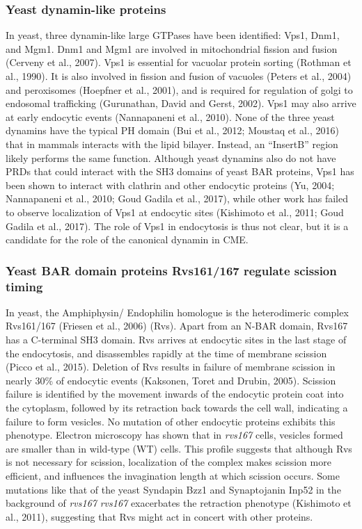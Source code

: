		\subsubsection{Yeast dynamin-like proteins}
In yeast, three dynamin-like large GTPases have been identified: Vps1, Dnm1, and Mgm1. Dnm1 and Mgm1 are involved in mitochondrial fission and fusion (Cerveny et al., 2007). Vps1 is essential for vacuolar protein sorting (Rothman et al., 1990). It is also involved in fission and fusion of vacuoles (Peters et al., 2004) and peroxisomes (Hoepfner et al., 2001), and is required for regulation of golgi to endosomal trafficking (Gurunathan, David and Gerst, 2002). Vps1 may also arrive at early endocytic events (Nannapaneni et al., 2010). None of the three yeast dynamins have the typical PH domain (Bui et al., 2012; Moustaq et al., 2016) that in mammals interacts with the lipid bilayer. Instead, an “InsertB” region likely performs the same function. Although yeast dynamins also do not have PRDs that could interact with the SH3 domains of yeast BAR proteins, Vps1 has been shown to interact with clathrin and other endocytic proteins (Yu, 2004; Nannapaneni et al., 2010; Goud Gadila et al., 2017), while other work has failed to observe localization of Vps1 at endocytic sites (Kishimoto et al., 2011; Goud Gadila et al., 2017). The role of Vps1 in endocytosis is thus not clear, but it is a candidate for the role of the canonical dynamin in CME.



		\subsubsection{Yeast BAR domain proteins Rvs161/167 regulate scission timing}
In yeast, the Amphiphysin/ Endophilin homologue is the heterodimeric complex Rvs161/167 (Friesen et al., 2006) (Rvs). Apart from an N-BAR domain, Rvs167 has a C-terminal SH3 domain. Rvs arrives at endocytic sites in the last stage of the endocytosis, and disassembles rapidly at the time of membrane scission (Picco et al., 2015). Deletion of Rvs results in failure of membrane scission in nearly 30\% of endocytic events (Kaksonen, Toret and Drubin, 2005). Scission failure is identified by the movement inwards of the endocytic protein coat into the cytoplasm, followed by its retraction back towards the cell wall, indicating a failure to form vesicles. No mutation of other endocytic proteins exhibits this phenotype. Electron microscopy has shown that in \textit{rvs167\textDelta} cells, vesicles formed are smaller than in wild-type (WT) cells. This profile suggests that although Rvs is not necessary for scission, localization of the complex makes scission more efficient, and influences the invagination length at which scission occurs. Some mutations like that of the yeast Syndapin Bzz1 and Synaptojanin Inp52 in the background of \textit{rvs167\textDelta} \textit{rvs167\textDelta} exacerbates the retraction phenotype (Kishimoto et al., 2011), suggesting that Rvs might act in concert with other proteins. 

